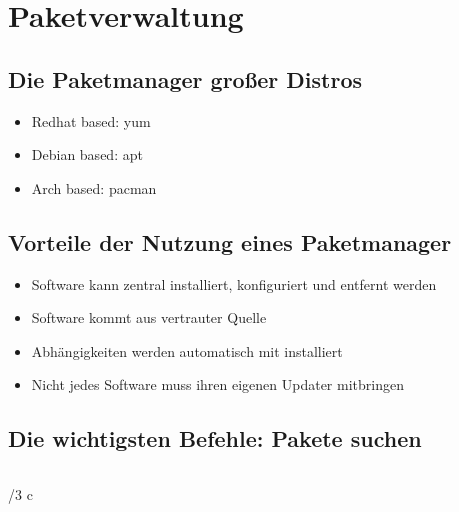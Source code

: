 \documentclass[
    ngerman,
    accentcolor=3b,
    dark_mode,
    fontsize= 12pt,
    a4paper,
    aspectratio=169,
    colorback=true,
    fancy_row_colors,
    leqno,
    fleqn,
    boxarc=3pt,
    fleqn,
    ]{algoslides}
\begin{document}
\section{Paketverwaltung}\label{package-management}\label{Paketverwaltung}
\subsection{Die Paketmanager großer Distros}
\begin{frame}
    \slidehead{}
    \begin{itemize}
        \item Redhat based: {\ttfamily yum}
        \item Debian based: {\ttfamily apt}
        \item Arch based: {\ttfamily pacman}
    \end{itemize}
\end{frame}
\subsection{Vorteile der Nutzung eines Paketmanager}
\begin{frame}
    \slidehead{}
    \begin{itemize}
        \item Software kann zentral installiert, konfiguriert und entfernt werden
        \item Software kommt aus vertrauter Quelle
        \item Abhängigkeiten werden automatisch mit installiert
        \item Nicht jedes Software muss ihren eigenen Updater mitbringen
    \end{itemize}
\end{frame}
\subsection{Die wichtigsten Befehle: Pakete suchen}
\begin{frame}[fragile]
    \slidehead{}
    \begin{columns}
        \begin{column}[c]{\textwidth/3}
            c
        \end{column}
    \end{columns}
\end{frame}
\end{document}

